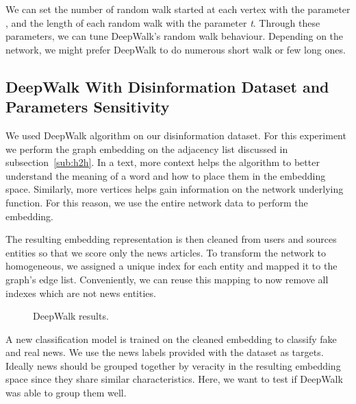 We can set the number of random walk started at each vertex with the parameter \textit{\gamma}, and the length of each random walk with the parameter \textit{t}.
Through these parameters, we can tune DeepWalk's random walk behaviour. 
Depending on the network, we might prefer DeepWalk to do numerous short walk or few long ones.

\subsection{DeepWalk With Disinformation Dataset and Parameters Sensitivity}

We used DeepWalk algorithm on our disinformation dataset.
For this experiment we perform the graph embedding on the adjacency list discussed in subsection~\ref{sub:h2h}.
In a text, more context helps the algorithm to better understand the meaning of a word and how to place them in the embedding space.
Similarly, more vertices helps gain information on the network underlying function.
For this reason, we use the entire network data to perform the embedding.

The resulting embedding representation is then cleaned from users and sources entities so that we score only the news articles.
To transform the network to homogeneous, we assigned a unique index for each entity and mapped it to the graph's edge list.
Conveniently, we can reuse this mapping to now remove all indexes which are not news entities.

\begin{figure}[h!]
    \centering
    \begin{subfigure}[b]{0.49\textwidth}
        \centering
        \scalebox{.5}{}
        \label{fig:deepwalk:representation window size}
    \end{subfigure}
    \hfill
    \begin{subfigure}[b]{0.49\textwidth}
        \centering
        \scalebox{.5}{}
        \label{fig:deepwalk:number walk length}
    \end{subfigure}
    \caption{DeepWalk results.}
    \label{fig:deepwalk:plots}
\end{figure}

A new classification model is trained on the cleaned embedding to classify fake and real news.
We use the news labels provided with the dataset as targets.
Ideally news should be grouped together by veracity in the resulting embedding space since they share similar characteristics.
Here, we want to test if DeepWalk was able to group them well.

